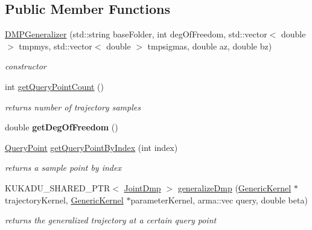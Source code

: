 \subsection*{Public Member Functions}
\begin{DoxyCompactItemize}
\item 
\hyperlink{classkukadu_1_1DMPGeneralizer_a75bfc264da4632ef2ce2454759b53d9c}{D\-M\-P\-Generalizer} (std\-::string base\-Folder, int deg\-Of\-Freedom, std\-::vector$<$ double $>$ tmpmys, std\-::vector$<$ double $>$ tmpsigmas, double az, double bz)
\begin{DoxyCompactList}\small\item\em constructor \end{DoxyCompactList}\item 
\hypertarget{classkukadu_1_1DMPGeneralizer_a66ae70315e509c84bb1763825a15b2ea}{int \hyperlink{classkukadu_1_1DMPGeneralizer_a66ae70315e509c84bb1763825a15b2ea}{get\-Query\-Point\-Count} ()}\label{classkukadu_1_1DMPGeneralizer_a66ae70315e509c84bb1763825a15b2ea}

\begin{DoxyCompactList}\small\item\em returns number of trajectory samples \end{DoxyCompactList}\item 
\hypertarget{classkukadu_1_1DMPGeneralizer_a603d560be6c932e1715d74bc581900fa}{double {\bfseries get\-Deg\-Of\-Freedom} ()}\label{classkukadu_1_1DMPGeneralizer_a603d560be6c932e1715d74bc581900fa}

\item 
\hyperlink{classkukadu_1_1QueryPoint}{Query\-Point} \hyperlink{classkukadu_1_1DMPGeneralizer_a670a0b673aee54cc4c10f308b1d211a2}{get\-Query\-Point\-By\-Index} (int index)
\begin{DoxyCompactList}\small\item\em returns a sample point by index \end{DoxyCompactList}\item 
K\-U\-K\-A\-D\-U\-\_\-\-S\-H\-A\-R\-E\-D\-\_\-\-P\-T\-R$<$ \hyperlink{classkukadu_1_1JointDmp}{Joint\-Dmp} $>$ \hyperlink{classkukadu_1_1DMPGeneralizer_acb8a703ee5bb8492d2035120ab51942b}{generalize\-Dmp} (\hyperlink{classkukadu_1_1GenericKernel}{Generic\-Kernel} $\ast$trajectory\-Kernel, \hyperlink{classkukadu_1_1GenericKernel}{Generic\-Kernel} $\ast$parameter\-Kernel, arma\-::vec query, double beta)
\begin{DoxyCompactList}\small\item\em returns the generalized trajectory at a certain query point \end{DoxyCompactList}\end{DoxyCompactItemize}


